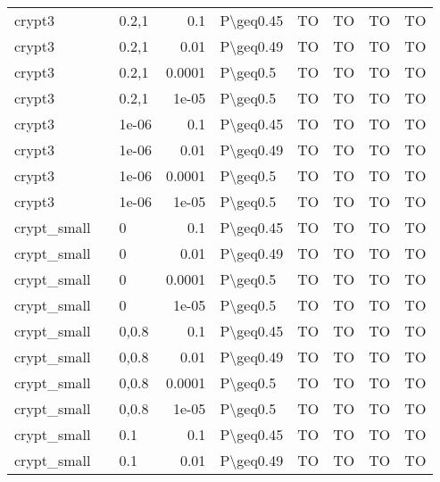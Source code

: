 \begin{longtable}{lllrlllll}
 crypt3        &           & 0.2,1 & 0.1    & P\textbackslash{}geq0.45  & TO   & TO   & TO       & TO      \\
 crypt3        &           & 0.2,1 & 0.01   & P\textbackslash{}geq0.49  & TO   & TO   & TO       & TO      \\
 crypt3        &           & 0.2,1 & 0.0001 & P\textbackslash{}geq0.5   & TO   & TO   & TO       & TO      \\
 crypt3        &           & 0.2,1 & 1e-05  & P\textbackslash{}geq0.5   & TO   & TO   & TO       & TO      \\
 crypt3        &           & 1e-06 & 0.1    & P\textbackslash{}geq0.45  & TO   & TO   & TO       & TO      \\
 crypt3        &           & 1e-06 & 0.01   & P\textbackslash{}geq0.49  & TO   & TO   & TO       & TO      \\
 crypt3        &           & 1e-06 & 0.0001 & P\textbackslash{}geq0.5   & TO   & TO   & TO       & TO      \\
 crypt3        &           & 1e-06 & 1e-05  & P\textbackslash{}geq0.5   & TO   & TO   & TO       & TO      \\
 crypt\_small   &           & 0     & 0.1    & P\textbackslash{}geq0.45  & TO   & TO   & TO       & TO      \\
 crypt\_small   &           & 0     & 0.01   & P\textbackslash{}geq0.49  & TO   & TO   & TO       & TO      \\
 crypt\_small   &           & 0     & 0.0001 & P\textbackslash{}geq0.5   & TO   & TO   & TO       & TO      \\
 crypt\_small   &           & 0     & 1e-05  & P\textbackslash{}geq0.5   & TO   & TO   & TO       & TO      \\
 crypt\_small   &           & 0,0.8 & 0.1    & P\textbackslash{}geq0.45  & TO   & TO   & TO       & TO      \\
 crypt\_small   &           & 0,0.8 & 0.01   & P\textbackslash{}geq0.49  & TO   & TO   & TO       & TO      \\
 crypt\_small   &           & 0,0.8 & 0.0001 & P\textbackslash{}geq0.5   & TO   & TO   & TO       & TO      \\
 crypt\_small   &           & 0,0.8 & 1e-05  & P\textbackslash{}geq0.5   & TO   & TO   & TO       & TO      \\
 crypt\_small   &           & 0.1   & 0.1    & P\textbackslash{}geq0.45  & TO   & TO   & TO       & TO      \\
 crypt\_small   &           & 0.1   & 0.01   & P\textbackslash{}geq0.49  & TO   & TO   & TO       & TO      \\

\end{longtable}
